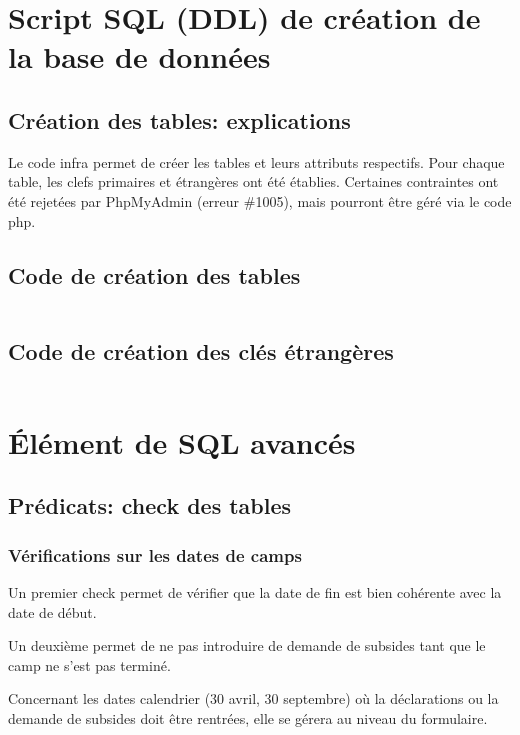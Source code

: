 \section{Script SQL (DDL) de création de la base de données}
\subsection{Création des tables: explications}
Le code infra permet de créer les tables et leurs attributs respectifs. Pour chaque table, les clefs primaires et étrangères ont été établies. Certaines contraintes ont été rejetées par PhpMyAdmin (erreur \#1005), mais pourront être géré via le code php.

\subsection{Code de création des tables}
\inputminted[breaklines =true, autogobble, linenos, frame = single]{sql}{Codes/code_creation.tex}

\subsection{Code de création des clés étrangères}
\inputminted[breaklines =true, autogobble, linenos, frame = single]{sql}{Codes/code_key.tex}


\section{Élément de SQL avancés}
\subsection{Prédicats: check des tables}
\subsubsection{Vérifications sur les dates de camps}
Un premier check permet de vérifier que la date de fin est bien cohérente avec la date de début.


Un deuxième permet de ne pas introduire de demande de subsides tant que le camp ne s'est pas terminé. 



Concernant les dates calendrier (30 avril, 30 septembre) où la déclarations ou la demande de subsides doit être rentrées, elle se gérera au niveau du formulaire. 

